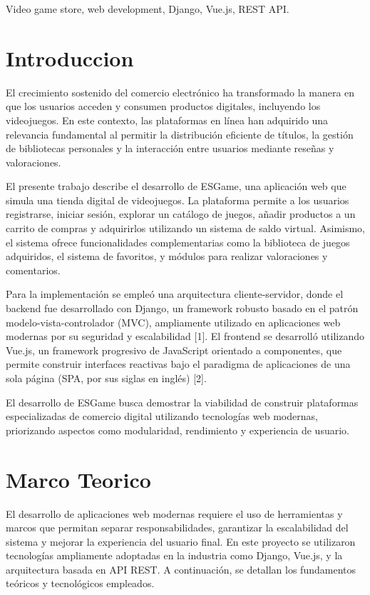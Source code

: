 \documentclass[conference]{IEEEtran}
\begin{document}
\begin{IEEEkeywords}
Video game store, web development, Django, Vue.js, REST API.
\end{IEEEkeywords}

\section{Introduccion}
El crecimiento sostenido del comercio electrónico ha transformado la manera en que los usuarios acceden y consumen productos digitales, incluyendo los videojuegos. En este contexto, las plataformas en línea han adquirido una relevancia fundamental al permitir la distribución eficiente de títulos, la gestión de bibliotecas personales y la interacción entre usuarios mediante reseñas y valoraciones.

El presente trabajo describe el desarrollo de ESGame, una aplicación web que simula una tienda digital de videojuegos. La plataforma permite a los usuarios registrarse, iniciar sesión, explorar un catálogo de juegos, añadir productos a un carrito de compras y adquirirlos utilizando un sistema de saldo virtual. Asimismo, el sistema ofrece funcionalidades complementarias como la biblioteca de juegos adquiridos, el sistema de favoritos, y módulos para realizar valoraciones y comentarios.

Para la implementación se empleó una arquitectura cliente-servidor, donde el backend fue desarrollado con Django, un framework robusto basado en el patrón modelo-vista-controlador (MVC), ampliamente utilizado en aplicaciones web modernas por su seguridad y escalabilidad [1]. El frontend se desarrolló utilizando Vue.js, un framework progresivo de JavaScript orientado a componentes, que permite construir interfaces reactivas bajo el paradigma de aplicaciones de una sola página (SPA, por sus siglas en inglés) [2].

El desarrollo de ESGame busca demostrar la viabilidad de construir plataformas especializadas de comercio digital utilizando tecnologías web modernas, priorizando aspectos como modularidad, rendimiento y experiencia de usuario.
 
\section{Marco Teorico}
El desarrollo de aplicaciones web modernas requiere el uso de herramientas y marcos que permitan separar responsabilidades, garantizar la escalabilidad del sistema y mejorar la experiencia del usuario final. En este proyecto se utilizaron tecnologías ampliamente adoptadas en la industria como Django, Vue.js, y la arquitectura basada en API REST. A continuación, se detallan los fundamentos teóricos y tecnológicos empleados.
\end{document}
